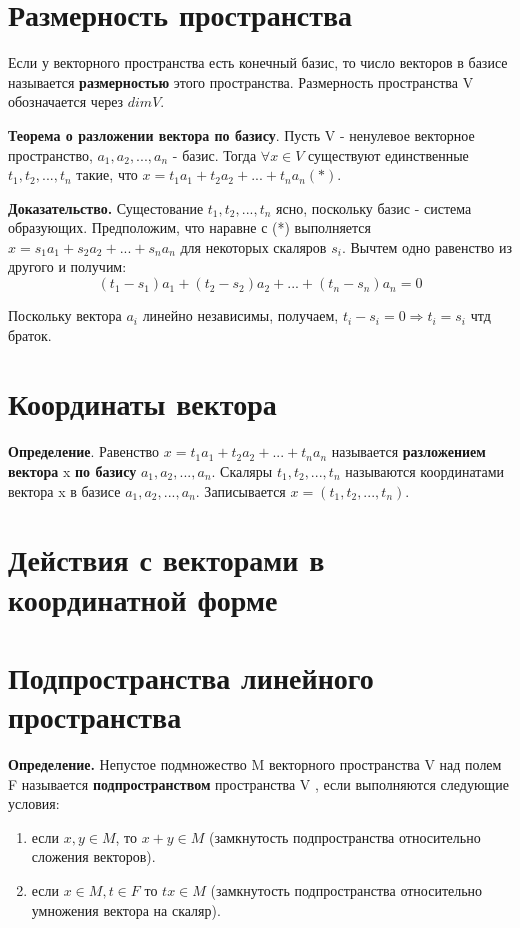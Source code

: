 \documentclass[a4paper]{article}
\begin{document}
\section*{Размерность пространства}
Если у векторного пространства есть конечный базис, то число векторов в базисе называется \textbf{размерностью} этого пространства.
Размерность пространства V обозначается через $dim V$.

\textbf{Теорема о разложении вектора по базису}. Пусть V - ненулевое векторное пространство, $a_1, a_2, ..., a_n$ - базис. Тогда $\forall x \in V$ существуют единственные $t_1, t_2, ..., t_n$ такие, что $x = t_1a_1 + t_2a_2 + ... + t_na_n (*)$.

\textbf{Доказательство.} Сущестование $t_1, t_2, ..., t_n$ ясно, поскольку базис - система образующих. Предположим, что наравне с (*) выполняется $x = s_1a_1 + s_2a_2 + ... + s_na_n$ для некоторых скаляров $s_i$. Вычтем одно равенство из другого и получим: \begin{equation}
(t_1-s_1)a_1 + (t_2-s_2)a_2 + ... + (t_n-s_n)a_n = 0
\end{equation}

Поскольку вектора $a_i$ линейно независимы, получаем, $t_i-s_i = 0 \Rightarrow t_i = s_i$ чтд браток.



\section*{Координаты вектора}
\textbf{Определение}. Равенство $x = t_1a_1 + t_2a_2 + ... + t_na_n$ называется \textbf{разложением вектора }
x \textbf{по базису} $a_1, a_2, ..., a_n$. Скаляры $t_1, t_2, ..., t_n$ называются координатами вектора x в базисе $a_1, a_2, ..., a_n$. Записывается $x = (t_1, t_2, ..., t_n)$. 

\section*{Действия с векторами в координатной форме}



\section*{Подпространства линейного пространства}
\textbf{Определение.} Непустое подмножество M векторного пространства V над полем F
называется \textbf{подпространством} пространства V , если выполняются
следующие условия:
\begin{enumerate}
\item если $x,y \in M$, то $x+y \in M$ (замкнутость подпространства относительно сложения векторов).
\item если $x \in M, t \in F$ то $tx \in M$ (замкнутость подпространства относительно умножения вектора на скаляр).
\end{enumerate}
\end{document}
